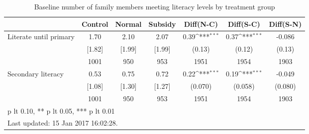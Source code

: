 \begin{table}[htbp]\centering
\def\sym#1{\ifmmode^{#1}\else\(^{#1}\)\fi}
\caption{Baseline number of family members meeting literacy levels by treatment group \label{tab:"balance"}}
\begin{tabular*}{1\hsize}{@{\hskip\tabcolsep\extracolsep\fill}l*{1}{cccccc}}
\toprule
                                &  Control&   Normal&  Subsidy&Diff(N-C)         &Diff(S-C)         &Diff(S-N)         \\
\midrule
Literate until primary          &     1.70&     2.10&     2.07&     0.39\sym{***}&     0.37\sym{***}&   -0.086         \\
                                &   [1.82]&   [1.99]&   [1.99]&   (0.13)         &   (0.12)         &   (0.13)         \\
                                &     1001&      950&      953&     1951         &     1954         &     1903         \\
Secondary literacy              &     0.53&     0.75&     0.72&     0.22\sym{***}&     0.19\sym{***}&   -0.049         \\
                                &   [1.08]&   [1.30]&   [1.27]&  (0.070)         &  (0.058)         &  (0.080)         \\
                                &     1001&      950&      953&     1951         &     1954         &     1903         \\
\bottomrule
\multicolumn{7}{l}{\footnotesize * p lt 0.10, ** p lt 0.05, *** p lt 0.01}\\
\multicolumn{7}{l}{\footnotesize Last updated: 15 Jan 2017 16:02:28.}\\
\end{tabular*}
\end{table}
